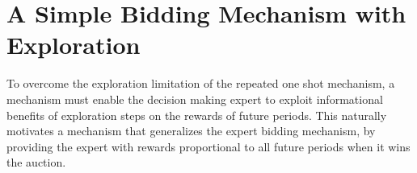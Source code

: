 





\section{A Simple Bidding Mechanism with Exploration}

To overcome the exploration limitation of the repeated one shot mechanism, a mechanism must enable the decision making expert to exploit informational benefits of exploration steps on the rewards of future periods.
This naturally motivates a mechanism that generalizes the expert bidding mechanism, by providing the expert with rewards proportional to all future periods when it wins the auction.

